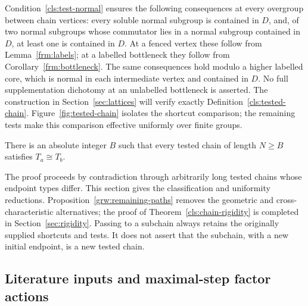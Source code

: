 Condition~\ref{cls:test-normal} ensures the following consequences at
every overgroup between chain vertices: every soluble normal subgroup
is contained in $D$, and, of two normal subgroups whose commutator
lies in a normal subgroup contained in $D$, at least one is contained
in $D$.  At a fenced vertex these follow from Lemma~\ref{frm:labels};
at a labelled bottleneck they follow from
Corollary~\ref{frm:bottleneck}.  The same consequences hold modulo a
higher labelled core, which is normal in each intermediate vertex
and contained in $D$.  No full supplementation dichotomy at an
unlabelled bottleneck is asserted.
The construction in Section~\ref{sec:lattices} will verify exactly
Definition~\ref{cls:tested-chain}.
Figure~\ref{fig:tested-chain} isolates the shortcut comparison; the
remaining tests make this comparison effective uniformly over finite groups.


\begin{theorem}\label{cls:chain-rigidity}
There is an absolute integer $B$ such that every tested chain of length
$N\geq B$ satisfies $T_a\cong T_b$.
\end{theorem}

The proof proceeds by contradiction through arbitrarily long tested
chains whose endpoint types differ.  This section gives the classification
and uniformity reductions.  Proposition~\ref{grw:remaining-paths} removes
the geometric and cross-characteristic alternatives; the proof of
Theorem~\ref{cls:chain-rigidity} is completed in Section~\ref{sec:rigidity}.
Passing to a subchain always retains the originally supplied shortcuts
and tests.  It does not assert that the subchain, with a new initial
endpoint, is a new tested chain.

\subsection{Literature inputs and maximal-step factor actions}

